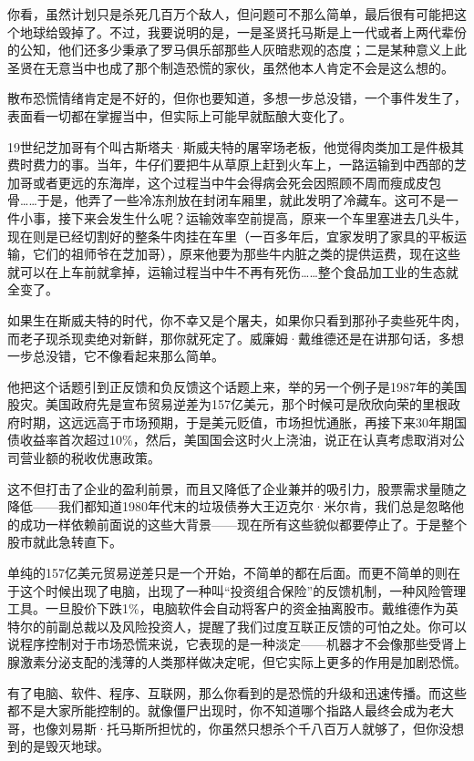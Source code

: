你看，虽然计划只是杀死几百万个敌人，但问题可不那么简单，最后很有可能把这个地球给毁掉了。不过，我要说明的是，一是圣贤托马斯是上一代或者上两代辈份的公知，他们还多少秉承了罗马俱乐部那些人灰暗悲观的态度；二是某种意义上此圣贤在无意当中也成了那个制造恐慌的家伙，虽然他本人肯定不会是这么想的。

散布恐慌情绪肯定是不好的，但你也要知道，多想一步总没错，一个事件发生了，表面看一切都在掌握当中，但实际上可能早就酝酿大变化了。

19世纪芝加哥有个叫古斯塔夫·斯威夫特的屠宰场老板，他觉得肉类加工是件极其费时费力的事。当年，牛仔们要把牛从草原上赶到火车上，一路运输到中西部的芝加哥或者更远的东海岸，这个过程当中牛会得病会死会因照顾不周而瘦成皮包骨\ldots{}\ldots{}于是，他弄了一些冷冻剂放在封闭车厢里，就此发明了冷藏车。这可不是一件小事，接下来会发生什么呢？运输效率空前提高，原来一个车里塞进去几头牛，现在则是已经切割好的整条牛肉挂在车里（一百多年后，宜家发明了家具的平板运输，它们的祖师爷在芝加哥），原来他要为那些牛内脏之类的提供运费，现在这些就可以在上车前就拿掉，运输过程当中牛不再有死伤\ldots{}\ldots{}整个食品加工业的生态就全变了。

如果生在斯威夫特的时代，你不幸又是个屠夫，如果你只看到那孙子卖些死牛肉，而老子现杀现卖绝对新鲜，那你就死定了。威廉姆·戴维德还是在讲那句话，多想一步总没错，它不像看起来那么简单。

他把这个话题引到正反馈和负反馈这个话题上来，举的另一个例子是1987年的美国股灾。美国政府先是宣布贸易逆差为157亿美元，那个时候可是欣欣向荣的里根政府时期，这远远高于市场预期，于是美元贬值，市场担忧通胀，再接下来30年期国债收益率首次超过10\%，然后，美国国会这时火上浇油，说正在认真考虑取消对公司营业额的税收优惠政策。

这不但打击了企业的盈利前景，而且又降低了企业兼并的吸引力，股票需求量随之降低------我们都知道1980年代末的垃圾债券大王迈克尔·米尔肯，我们总是忽略他的成功一样依赖前面说的这些大背景------现在所有这些貌似都要停止了。于是整个股市就此急转直下。

单纯的157亿美元贸易逆差只是一个开始，不简单的都在后面。而更不简单的则在于这个时候出现了电脑，出现了一种叫``投资组合保险''的反馈机制，一种风险管理工具。一旦股价下跌1\%，电脑软件会自动将客户的资金抽离股市。戴维德作为英特尔的前副总裁以及风险投资人，提醒了我们过度互联正反馈的可怕之处。你可以说程序控制对于市场恐慌来说，它表现的是一种淡定------机器才不会像那些受肾上腺激素分泌支配的浅薄的人类那样做决定呢，但它实际上更多的作用是加剧恐慌。

有了电脑、软件、程序、互联网，那么你看到的是恐慌的升级和迅速传播。而这些都不是大家所能控制的。就像僵尸出现时，你不知道哪个指路人最终会成为老大哥，也像刘易斯·托马斯所担忧的，你虽然只想杀个千八百万人就够了，但你没想到的是毁灭地球。

